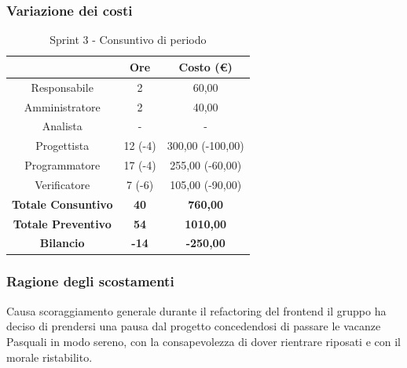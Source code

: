 \subsubsection{Variazione dei costi} \label{subsubsection:variazione_costi_sprint3}

\begin{table}[H]
  \centering
  \renewcommand{\arraystretch}{1.8}
  \begin{tabular}{c|c|c}
    \rowcolor[HTML]{125E28}
    \multicolumn{1}{c}{\color[HTML]{FFFFFF}\textbf{Ruolo}} &
    \multicolumn{1}{c}{\color[HTML]{FFFFFF}\textbf{Ore}}   &
    \multicolumn{1}{c}{\color[HTML]{FFFFFF}\textbf{Costo (€)}}                               \\
    \hline
    Responsabile                                           & 2            & 60,00            \\
    Amministratore                                         & 2            & 40,00            \\
    Analista                                               & -            & -                \\
    Progettista                                            & 12 (-4)      & 300,00 (-100,00) \\
    Programmatore                                          & 17 (-4)      & 255,00 (-60,00)  \\
    Verificatore                                           & 7 (-6)       & 105,00 (-90,00)  \\
    \textbf{Totale Consuntivo}                             & \textbf{40}  & \textbf{760,00}  \\
    \textbf{Totale Preventivo}                             & \textbf{54}  & \textbf{1010,00} \\
    \textbf{Bilancio}                                      & \textbf{-14} & \textbf{-250,00} \\
  \end{tabular}
  \caption{Sprint 3 - Consuntivo di periodo}
\end{table}

\subsubsection{Ragione degli scostamenti} \label{subsubsection:ragione_scostamenti_sprint3}
Causa scoraggiamento generale durante il refactoring\glo{} del frontend\glo{} il gruppo ha deciso di prendersi una pausa dal progetto concedendosi di passare le vacanze Pasquali in modo sereno, con la consapevolezza di dover rientrare riposati e con il morale ristabilito.


